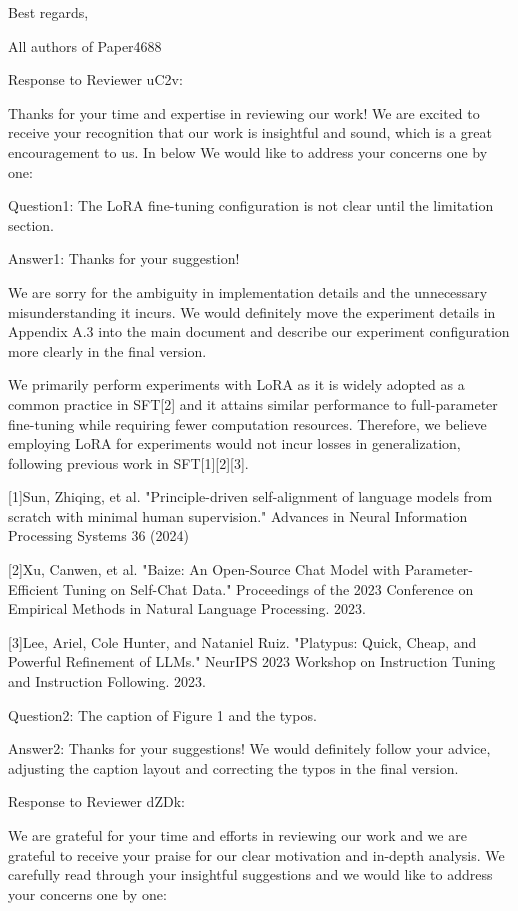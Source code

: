 Best regards,

All authors of Paper4688


Response to Reviewer uC2v:

Thanks for your time and expertise in reviewing our work! We are excited to receive your recognition that our work is insightful and sound, which is a great encouragement to us. In below We would like to address your concerns one by one:

Question1: The LoRA fine-tuning configuration is not clear until the limitation section.

Answer1: Thanks for your suggestion! 

We are sorry for the ambiguity in implementation details and the unnecessary misunderstanding it incurs. We would definitely move the experiment details in Appendix A.3 into the main document and describe our experiment configuration more clearly in the final version. 

We primarily perform experiments with LoRA as it is widely adopted as a common practice in SFT[2] and it attains similar performance to full-parameter fine-tuning while requiring fewer computation resources. Therefore, we believe employing LoRA for experiments would not incur losses in generalization, following previous work in SFT[1][2][3]. 

[1]Sun, Zhiqing, et al. "Principle-driven self-alignment of language models from scratch with minimal human supervision." Advances in Neural Information Processing Systems 36 (2024)

[2]Xu, Canwen, et al. "Baize: An Open-Source Chat Model with Parameter-Efficient Tuning on Self-Chat Data." Proceedings of the 2023 Conference on Empirical Methods in Natural Language Processing. 2023.

[3]Lee, Ariel, Cole Hunter, and Nataniel Ruiz. "Platypus: Quick, Cheap, and Powerful Refinement of LLMs." NeurIPS 2023 Workshop on Instruction Tuning and Instruction Following. 2023.



Question2: The caption of Figure 1 and the typos.

Answer2: Thanks for your suggestions! We would definitely follow your advice, adjusting the caption layout and correcting the typos in the final version. 


Response to Reviewer dZDk:

We are grateful for your time and efforts in reviewing our work and we are grateful to receive your praise for our clear motivation and in-depth analysis. We carefully read through your insightful suggestions and we would like to address your concerns one by one: 

